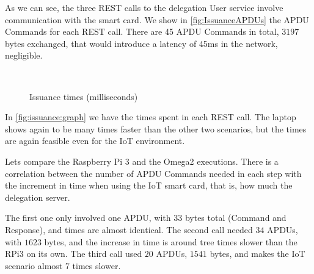 As we can see, the three REST calls to the delegation User service involve communication with the smart card. We show in \autoref{fig:IssuanceAPDUs} the APDU Commands for each REST call.
There are 45 APDU Commands in total, $3197$ bytes exchanged, that would introduce a latency of 45ms in the network, negligible.


\begin{figure}[bth]
	\myfloatalign
	 \quad
	 \\
	\caption{Issuance times (milliseconds)}
	\label{fig:issuance:graph}
\end{figure}

In \autoref{fig:issuance:graph} we have the times spent in each REST call. The laptop shows again to be many times faster than the other two scenarios, but the times are again feasible even for the IoT environment.

Lets compare the Raspberry Pi 3 and the Omega2 executions. There is a correlation between the number of APDU Commands needed in each step with the increment in time when using the IoT smart card, that is, how much the delegation server.

The first one only involved one APDU, with $33$ bytes total (Command and Response), and times are almost identical. The second call needed $34$ APDUs, with $1623$ bytes, and the increase in time is around tree times slower than the RPi3 on its own. The third call used $20$ APDUs, $1541$ bytes, and makes the IoT scenario almost 7 times slower.

